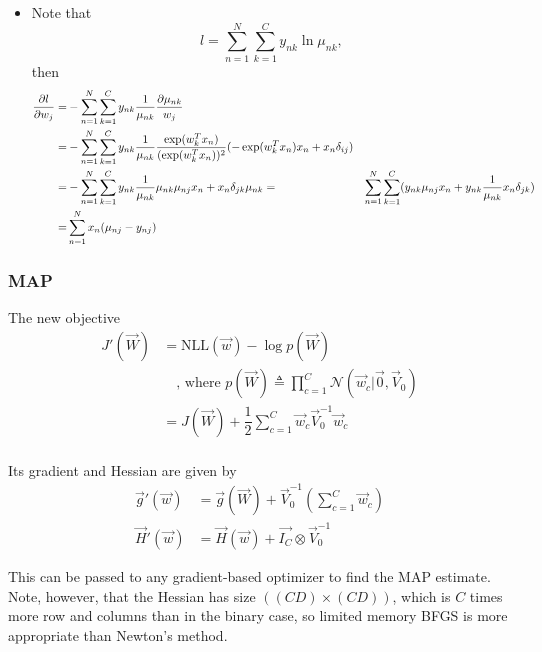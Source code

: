 \begin{refsection}
\begin{remark}
	\begin{itemize}
		\item Note that $$l = \sum_{n=1}^{N}\sum_{k=1}^{C}y_{nk}\ln \mu_{nk},$$
		then
		\begin{align*}
		\frac{\partial l}{\partial w_j} = & -\sum_{n=1}^{N}\sum_{k=1}^{C}y_{nk}\frac{1}{\mu_{nk}}\frac{\partial \mu_{nk}}{w_j} \\
		=&-\sum_{n=1}^{N}\sum_{k=1}^{C}y_{nk}\frac{1}{\mu_{nk}}\frac{\exp(w_k^Tx_n)}{(\exp(w_k^Tx_n))^2}(-\exp(w_k^Tx_n)x_n+x_n\delta_{ij}) \\
		=&-\sum_{n=1}^{N}\sum_{k=1}^{C}y_{nk}\frac{1}{\mu_{nk}}\mu_{nk}\mu_{nj}x_n + x_n\delta_{jk}\mu_{nk}
		=&\sum_{n=1}^{N}\sum_{k=1}^{C} (y_{nk}\mu_{nj}x_n + y_{nk}\frac{1}{\mu_{nk}}x_n\delta_{jk})\\
		=&\sum_{n=1}^{N} x_n(\mu_{nj}-y_{nj})
		\end{align*}
	\end{itemize}	
	
\end{remark}



\subsubsection{MAP}
The new objective
\begin{align}
J'(\vec{W}) & =\mathrm{NLL}(\vec{w})-\log{p(\vec{W})} \\
& \quad \text{, where } p(\vec{W}) \triangleq \prod\limits_{c=1}^C \mathcal{N}(\vec{w}_c|\vec{0},\vec{V}_0) \nonumber \\
& = J(\vec{W})+\dfrac{1}{2}\sum\limits_{c=1}^C \vec{w}_c\vec{V}_0^{-1}\vec{w}_c \\
\end{align}

Its gradient and Hessian are given by
\begin{align}
\vec{g}'(\vec{w}) & =\vec{g}(\vec{W})+\vec{V}_0^{-1}\left(\sum\limits_{c=1}^C \vec{w}_c\right) \\
\vec{H}'(\vec{w}) & =\vec{H}(\vec{w})+\vec{I_C} \otimes \vec{V}_0^{-1}
\end{align}

This can be passed to any gradient-based optimizer to find the MAP estimate. Note, however, that the Hessian has size $((CD)×(CD))$, which is $C$ times more row and columns than in the binary case, so limited memory BFGS is more appropriate than Newton’s method.








\end{refsection}
